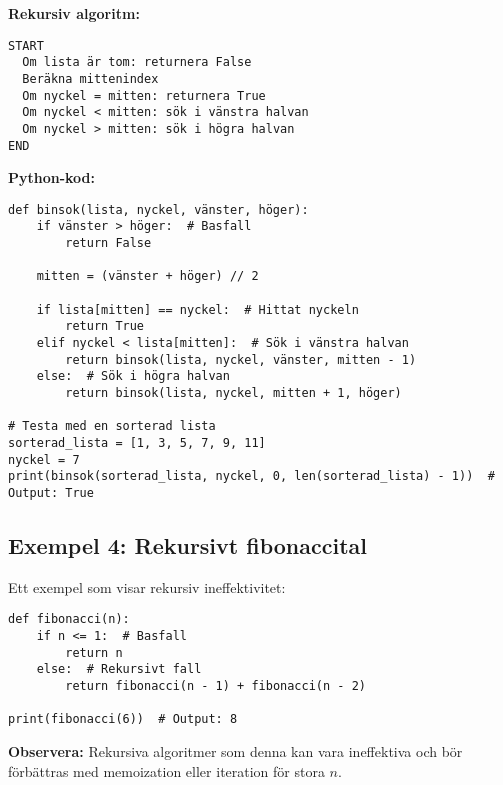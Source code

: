 \textbf{Rekursiv algoritm:}
\begin{verbatim}
START
  Om lista är tom: returnera False
  Beräkna mittenindex
  Om nyckel = mitten: returnera True
  Om nyckel < mitten: sök i vänstra halvan
  Om nyckel > mitten: sök i högra halvan
END
\end{verbatim}

\textbf{Python-kod:}
\begin{lstlisting}[title=Binärsökning med rekursion]
def binsok(lista, nyckel, vänster, höger):
    if vänster > höger:  # Basfall
        return False

    mitten = (vänster + höger) // 2

    if lista[mitten] == nyckel:  # Hittat nyckeln
        return True
    elif nyckel < lista[mitten]:  # Sök i vänstra halvan
        return binsok(lista, nyckel, vänster, mitten - 1)
    else:  # Sök i högra halvan
        return binsok(lista, nyckel, mitten + 1, höger)

# Testa med en sorterad lista
sorterad_lista = [1, 3, 5, 7, 9, 11]
nyckel = 7
print(binsok(sorterad_lista, nyckel, 0, len(sorterad_lista) - 1))  # Output: True
\end{lstlisting}

\subsection*{Exempel 4: Rekursivt fibonaccital}

Ett exempel som visar rekursiv ineffektivitet:
\begin{lstlisting}[title=Fibonaccital med rekursion]
def fibonacci(n):
    if n <= 1:  # Basfall
        return n
    else:  # Rekursivt fall
        return fibonacci(n - 1) + fibonacci(n - 2)

print(fibonacci(6))  # Output: 8
\end{lstlisting}
\textbf{Observera:} Rekursiva algoritmer som denna kan vara ineffektiva och bör förbättras med memoization eller iteration för stora \( n \).
